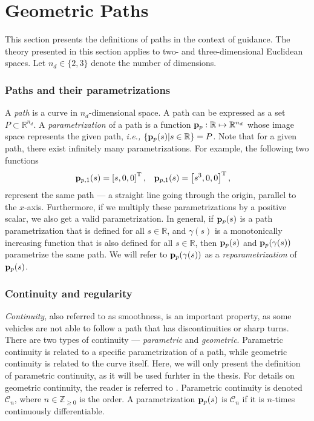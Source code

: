 \section{Geometric Paths}
\label{sec:background_paths}

This section presents the definitions of paths in the context of guidance.
The theory presented in this section applies to two- and three-dimensional Euclidean spaces.
Let $n_d \in \{2,3\}$ denote the number of dimensions.

\subsubsection*{Paths and their parametrizations}
A \emph{path} is a curve in $n_d$-dimensional space.
A path can be expressed as a set $P \subset \mathbb{R}^{n_d}$.
A \emph{parametrization} of a path is a function $\mathbf{p}_p : \mathbb{R} \mapsto \mathbb{R}^{n_d}$ whose image space represents the given path, \emph{i.e.,} $\{\mathbf{p}_p(s) | s \in \mathbb{R}\} = P$.
Note that for a given path, there exist infinitely many parametrizations.
For example, the following two functions
\begin{align}
    \mathbf{p}_{p, 1}(s) &= \left[s, 0, 0\right]^{\mathrm{T}}, &
    \mathbf{p}_{p, 1}(s) &= \left[s^3, 0, 0\right]^{\mathrm{T}},
    \label{eq:background_path_example}
\end{align}
represent the same path --- a straight line going through the origin, parallel to the $x$-axis.
Furthermore, if we multiply these parametrizations by a positive scalar, we also get a valid parametrization.
In general, if $\mathbf{p}_p(s)$ is a path parametrization that is defined for all $s \in \mathbb{R}$, and $\gamma(s)$ is a monotonically increasing function that is also defined for all $s \in \mathbb{R}$, then $\mathbf{p}_p(s)$ and $\mathbf{p}_p(\gamma(s))$ parametrize the same path.
We will refer to $\mathbf{p}_p(\gamma(s))$ as a \emph{reparametrization} of $\mathbf{p}_p(s)$.

\subsubsection*{Continuity and regularity}
\emph{Continuity}, also referred to as smoothness, is an important property, as some vehicles are not able to follow a path that has discontinuities or sharp turns.
There are two types of continuity --- \emph{parametric} and \emph{geometric}.
Parametric continuity is related to a specific parametrization of a path, while geometric continuity is related to the curve itself.
Here, we will only present the definition of parametric continuity, as it will be used furhter in the thesis.
For details on geometric continuity, the reader is referred to \cite{barsky_geometric_1984}.
Parametric continuity is denoted $\mathcal{C}_n$, where $n \in \mathbb{Z}_{\geq 0}$ is the order.
A parametrization $\mathbf{p}_p(s)$ is $\mathcal{C}_n$ if it is $n$-times continuously differentiable.

